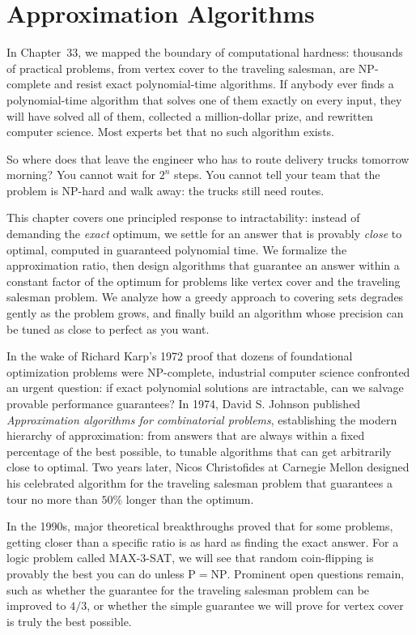 \chapter{Approximation Algorithms}
\label{ch34:approx}

In Chapter~33, we mapped the boundary of computational hardness: thousands of practical problems, from vertex cover to the traveling salesman, are NP-complete and resist exact polynomial-time algorithms. If anybody ever finds a polynomial-time algorithm that solves one of them exactly on every input, they will have solved all of them, collected a million-dollar prize, and rewritten computer science. Most experts bet that no such algorithm exists.

So where does that leave the engineer who has to route delivery trucks tomorrow morning? You cannot wait for $2^{n}$ steps. You cannot tell your team that the problem is NP-hard and walk away: the trucks still need routes.

This chapter covers one principled response to intractability: instead of demanding the \emph{exact} optimum, we settle for an answer that is provably \emph{close} to optimal, computed in guaranteed polynomial time. We formalize the approximation ratio, then design algorithms that guarantee an answer within a constant factor of the optimum for problems like vertex cover and the traveling salesman problem. We analyze how a greedy approach to covering sets degrades gently as the problem grows, and finally build an algorithm whose precision can be tuned as close to perfect as you want.

\begin{historybox}
In the wake of Richard Karp's 1972 proof that dozens of foundational optimization problems were NP-complete, industrial computer science confronted an urgent question: if exact polynomial solutions are intractable, can we salvage provable performance guarantees? In 1974, David S. Johnson published \emph{Approximation algorithms for combinatorial problems}, establishing the modern hierarchy of approximation: from answers that are always within a fixed percentage of the best possible, to tunable algorithms that can get arbitrarily close to optimal. Two years later, Nicos Christofides at Carnegie Mellon designed his celebrated algorithm for the traveling salesman problem that guarantees a tour no more than $50\%$ longer than the optimum.

In the 1990s, major theoretical breakthroughs proved that for some problems, getting closer than a specific ratio is as hard as finding the exact answer. For a logic problem called MAX-3-SAT, we will see that random coin-flipping is provably the best you can do unless $\mathrm{P} = \mathrm{NP}$. Prominent open questions remain, such as whether the guarantee for the traveling salesman problem can be improved to $4/3$, or whether the simple guarantee we will prove for vertex cover is truly the best possible.
\end{historybox}

